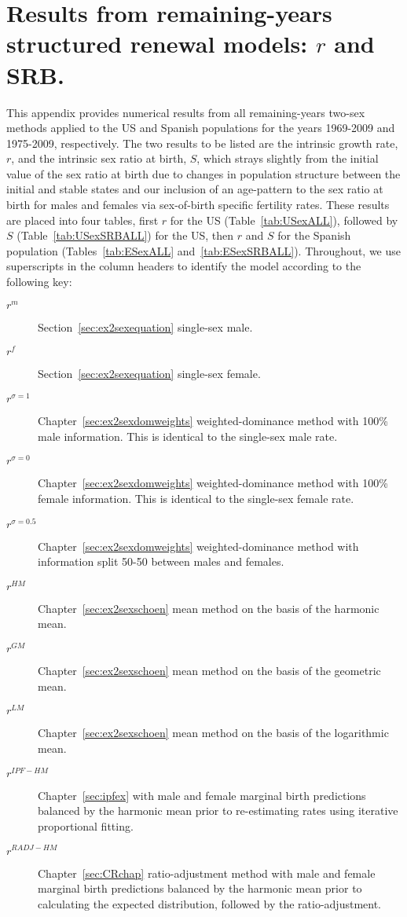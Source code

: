 
\chapter{Results from remaining-years structured renewal models: $r$ and SRB.}
\label{appendix:exallrestimates}

This appendix provides numerical results from all remaining-years two-sex
methods applied to the US and Spanish populations for the years 1969-2009 and
1975-2009, respectively. The two results to be listed are the intrinsic growth
rate, $r$, and the intrinsic sex ratio at birth, $S$, which strays slightly from
the initial value of the sex ratio at birth due to changes in population
structure between the initial and stable states and our inclusion of an
age-pattern to the sex ratio at birth for males and females via sex-of-birth
specific fertility rates. These results are placed into four tables, first $r$
for the US (Table~\ref{tab:USexALL}), followed by $S$
(Table~\ref{tab:USexSRBALL}) for the US, then $r$ and $S$ for the Spanish
population (Tables~\ref{tab:ESexALL} and~\ref{tab:ESexSRBALL}). Throughout, we
use superscripts in the column headers to identify the model according to the following key:
\begin{description}
  \item[$r^m$] Section~\ref{sec:ex2sexequation} single-sex male.
  \item[$r^f$] Section~\ref{sec:ex2sexequation} single-sex female.
  \item[$r^{\sigma=1}$] Chapter~\ref{sec:ex2sexdomweights} weighted-dominance
  method with 100\% male information. This is identical to the single-sex male rate.
  \item[$r^{\sigma=0}$] Chapter~\ref{sec:ex2sexdomweights} weighted-dominance
  method with 100\% female information. This is identical to the single-sex female rate.
  \item[$r^{\sigma=0.5}$] Chapter~\ref{sec:ex2sexdomweights} weighted-dominance
  method with information split 50-50 between males and females.
  \item[$r^{HM}$] Chapter~\ref{sec:ex2sexschoen} mean method on the basis of
  the harmonic mean.
  \item[$r^{GM}$] Chapter~\ref{sec:ex2sexschoen} mean method on the basis of
  the geometric mean.
  \item[$r^{LM}$] Chapter~\ref{sec:ex2sexschoen} mean method on the basis of
  the logarithmic mean.
  \item[$r^{IPF-HM}$] Chapter~\ref{sec:ipfex} with male and female marginal
  birth predictions balanced by the harmonic mean prior to re-estimating rates
  using iterative proportional fitting.
  \item[$r^{RADJ-HM}$] Chapter~\ref{sec:CRchap} ratio-adjustment method with
  male and female marginal birth predictions balanced by the harmonic mean prior to
  calculating the expected distribution, followed by the ratio-adjustment.
  \end{description}
